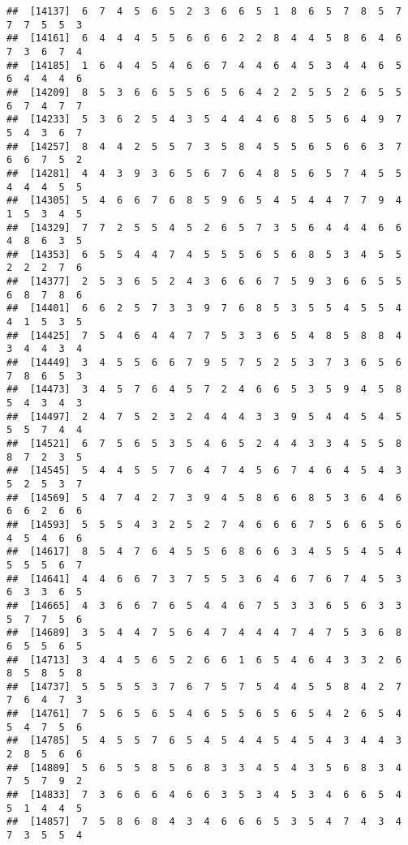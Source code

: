 \documentclass[
]{book}
\begin{document}
\begin{verbatim}
##  [14137]  6  7  4  5  6  5  2  3  6  6  5  1  8  6  5  7  8  5  7  7  7  5  5  3
##  [14161]  6  4  4  4  5  5  6  6  6  2  2  8  4  4  5  8  6  4  6  7  3  6  7  4
##  [14185]  1  6  4  4  5  4  6  6  7  4  4  6  4  5  3  4  4  6  5  6  4  4  4  6
##  [14209]  8  5  3  6  6  5  5  6  5  6  4  2  2  5  5  2  6  5  5  6  7  4  7  7
##  [14233]  5  3  6  2  5  4  3  5  4  4  4  6  8  5  5  6  4  9  7  5  4  3  6  7
##  [14257]  8  4  4  2  5  5  7  3  5  8  4  5  5  6  5  6  6  3  7  6  6  7  5  2
##  [14281]  4  4  3  9  3  6  5  6  7  6  4  8  5  6  5  7  4  5  5  4  4  4  5  5
##  [14305]  5  4  6  6  7  6  8  5  9  6  5  4  5  4  4  7  7  9  4  1  5  3  4  5
##  [14329]  7  7  2  5  5  4  5  2  6  5  7  3  5  6  4  4  4  6  6  4  8  6  3  5
##  [14353]  6  5  5  4  4  7  4  5  5  5  6  5  6  8  5  3  4  5  5  2  2  2  7  6
##  [14377]  2  5  3  6  5  2  4  3  6  6  6  7  5  9  3  6  6  5  5  6  8  7  8  6
##  [14401]  6  6  2  5  7  3  3  9  7  6  8  5  3  5  5  4  5  5  4  4  1  5  3  5
##  [14425]  7  5  4  6  4  4  7  7  5  3  3  6  5  4  8  5  8  8  4  3  4  4  3  4
##  [14449]  3  4  5  5  6  6  7  9  5  7  5  2  5  3  7  3  6  5  6  7  8  6  5  3
##  [14473]  3  4  5  7  6  4  5  7  2  4  6  6  5  3  5  9  4  5  8  5  4  3  4  3
##  [14497]  2  4  7  5  2  3  2  4  4  4  3  3  9  5  4  4  5  4  5  5  5  7  4  4
##  [14521]  6  7  5  6  5  3  5  4  6  5  2  4  4  3  3  4  5  5  8  8  7  2  3  5
##  [14545]  5  4  4  5  5  7  6  4  7  4  5  6  7  4  6  4  5  4  3  5  2  5  3  7
##  [14569]  5  4  7  4  2  7  3  9  4  5  8  6  6  8  5  3  6  4  6  6  6  2  6  6
##  [14593]  5  5  5  4  3  2  5  2  7  4  6  6  6  7  5  6  6  5  6  4  5  4  6  6
##  [14617]  8  5  4  7  6  4  5  5  6  8  6  6  3  4  5  5  4  5  4  5  5  5  6  7
##  [14641]  4  4  6  6  7  3  7  5  5  3  6  4  6  7  6  7  4  5  3  6  3  3  6  5
##  [14665]  4  3  6  6  7  6  5  4  4  6  7  5  3  3  6  5  6  3  3  5  7  7  5  6
##  [14689]  3  5  4  4  7  5  6  4  7  4  4  4  7  4  7  5  3  6  8  6  5  5  6  5
##  [14713]  3  4  4  5  6  5  2  6  6  1  6  5  4  6  4  3  3  2  6  8  5  8  5  8
##  [14737]  5  5  5  5  3  7  6  7  5  7  5  4  4  5  5  8  4  2  7  7  6  4  7  3
##  [14761]  7  5  6  5  6  5  4  6  5  5  6  5  6  5  4  2  6  5  4  5  4  7  5  6
##  [14785]  5  4  5  5  7  6  5  4  5  4  4  5  4  5  4  3  4  4  3  2  8  5  6  6
##  [14809]  5  6  5  5  8  5  6  8  3  3  4  5  4  3  5  6  8  3  4  7  5  7  9  2
##  [14833]  7  3  6  6  6  4  6  6  3  5  3  4  5  3  4  6  6  5  4  5  1  4  4  5
##  [14857]  7  5  8  6  8  4  3  4  6  6  6  5  3  5  4  7  4  3  4  7  3  5  5  4

\end{verbatim}
\end{document}
